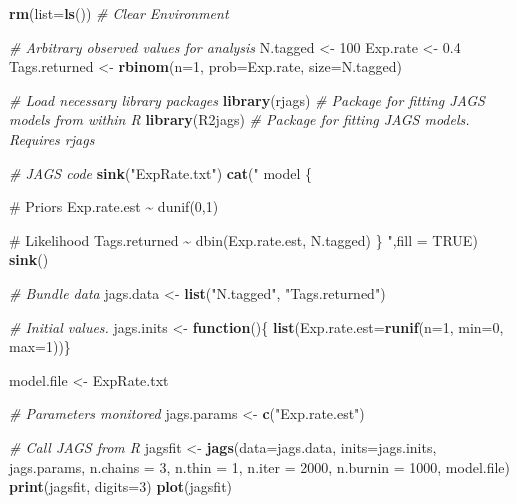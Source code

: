 \documentclass[
]{krantz}
\makeatletter
\newenvironment{Shaded}{\begin{snugshade}}{\end{snugshade}}
\newcommand{\AttributeTok}[1]{\textcolor[rgb]{0.27,0.27,0.27}{#1}}
\newcommand{\CommentTok}[1]{\textcolor[rgb]{0.37,0.37,0.37}{\textit{#1}}}
\newcommand{\ConstantTok}[1]{\textcolor[rgb]{0.37,0.37,0.37}{#1}}
\newcommand{\ControlFlowTok}[1]{\textcolor[rgb]{0.27,0.27,0.27}{\textbf{#1}}}
\newcommand{\DecValTok}[1]{\textcolor[rgb]{0.06,0.06,0.06}{#1}}
\newcommand{\FloatTok}[1]{\textcolor[rgb]{0.06,0.06,0.06}{#1}}
\newcommand{\FunctionTok}[1]{\textcolor[rgb]{0.27,0.27,0.27}{\textbf{#1}}}
\newcommand{\NormalTok}[1]{#1}
\newcommand{\OtherTok}[1]{\textcolor[rgb]{0.37,0.37,0.37}{#1}}
\newcommand{\StringTok}[1]{\textcolor[rgb]{0.5,0.5,0.5}{#1}}
\newenvironment{kframe}{%
\medskip{}
\setlength{\fboxsep}{.8em}
 \def\at@end@of@kframe{}%
 \ifinner\ifhmode%
  \def\at@end@of@kframe{\end{minipage}}%
  \begin{minipage}{\columnwidth}%
 \fi\fi%
 \def\FrameCommand##1{\hskip\@totalleftmargin \hskip-\fboxsep
 \colorbox{shadecolor}{##1}\hskip-\fboxsep
     \hskip-\linewidth \hskip-\@totalleftmargin \hskip\columnwidth}%
 \MakeFramed {\advance\hsize-\width
   \@totalleftmargin\z@ \linewidth\hsize
   \@setminipage}}%
 {\par\unskip\endMakeFramed%
 \at@end@of@kframe}
\renewenvironment{Shaded}{\begin{kframe}}{\end{kframe}}
\makeatother
\begin{document}
\begin{Shaded}
\begin{Highlighting}[]
\FunctionTok{rm}\NormalTok{(}\AttributeTok{list=}\FunctionTok{ls}\NormalTok{()) }\CommentTok{\# Clear Environment}

\CommentTok{\# Arbitrary \textquotesingle{}observed\textquotesingle{} values for analysis}
\NormalTok{N.tagged }\OtherTok{\textless{}{-}} \DecValTok{100}
\NormalTok{Exp.rate }\OtherTok{\textless{}{-}} \FloatTok{0.4}
\NormalTok{Tags.returned }\OtherTok{\textless{}{-}} \FunctionTok{rbinom}\NormalTok{(}\AttributeTok{n=}\DecValTok{1}\NormalTok{, }\AttributeTok{prob=}\NormalTok{Exp.rate, }\AttributeTok{size=}\NormalTok{N.tagged)}

\CommentTok{\# Load necessary library packages}
\FunctionTok{library}\NormalTok{(rjags)   }\CommentTok{\# Package for fitting JAGS models from within R}
\FunctionTok{library}\NormalTok{(R2jags)  }\CommentTok{\# Package for fitting JAGS models. Requires rjags}

\CommentTok{\# JAGS code}
\FunctionTok{sink}\NormalTok{(}\StringTok{"ExpRate.txt"}\NormalTok{)}
\FunctionTok{cat}\NormalTok{(}\StringTok{"}
\StringTok{    model \{}

\StringTok{    \# Priors}
\StringTok{    Exp.rate.est \textasciitilde{} dunif(0,1)}

\StringTok{    \# Likelihood}
\StringTok{    Tags.returned \textasciitilde{} dbin(Exp.rate.est, N.tagged)}
\StringTok{\}}
\StringTok{    "}\NormalTok{,}\AttributeTok{fill =} \ConstantTok{TRUE}\NormalTok{)}
\FunctionTok{sink}\NormalTok{()}

\CommentTok{\# Bundle data}
\NormalTok{jags.data }\OtherTok{\textless{}{-}} \FunctionTok{list}\NormalTok{(}\StringTok{"N.tagged"}\NormalTok{, }\StringTok{"Tags.returned"}\NormalTok{)}

\CommentTok{\# Initial values.}
\NormalTok{jags.inits }\OtherTok{\textless{}{-}} \ControlFlowTok{function}\NormalTok{()\{ }\FunctionTok{list}\NormalTok{(}\AttributeTok{Exp.rate.est=}\FunctionTok{runif}\NormalTok{(}\AttributeTok{n=}\DecValTok{1}\NormalTok{, }\AttributeTok{min=}\DecValTok{0}\NormalTok{, }\AttributeTok{max=}\DecValTok{1}\NormalTok{))\}}

\NormalTok{model.file }\OtherTok{\textless{}{-}} \StringTok{\textquotesingle{}ExpRate.txt\textquotesingle{}}

\CommentTok{\# Parameters monitored}
\NormalTok{jags.params }\OtherTok{\textless{}{-}} \FunctionTok{c}\NormalTok{(}\StringTok{"Exp.rate.est"}\NormalTok{)}

\CommentTok{\# Call JAGS from R}
\NormalTok{jagsfit }\OtherTok{\textless{}{-}} \FunctionTok{jags}\NormalTok{(}\AttributeTok{data=}\NormalTok{jags.data, }\AttributeTok{inits=}\NormalTok{jags.inits, jags.params,}
                \AttributeTok{n.chains =} \DecValTok{3}\NormalTok{, }\AttributeTok{n.thin =} \DecValTok{1}\NormalTok{, }\AttributeTok{n.iter =} \DecValTok{2000}\NormalTok{, }\AttributeTok{n.burnin =} \DecValTok{1000}\NormalTok{,}
\NormalTok{                model.file)}
\FunctionTok{print}\NormalTok{(jagsfit, }\AttributeTok{digits=}\DecValTok{3}\NormalTok{)}
\FunctionTok{plot}\NormalTok{(jagsfit)}
\end{Highlighting}
\end{Shaded}
\end{document}
